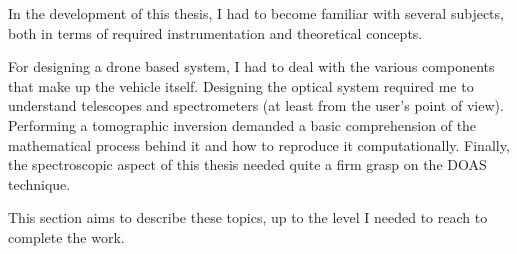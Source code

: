 In the development of this thesis, I had to become familiar with several
subjects, both in terms of required instrumentation and theoretical
concepts.

For designing a drone based system, I had to deal with the various
components that make up the vehicle itself. Designing the optical system
required me to understand telescopes and spectrometers (at least from
the user's point of view). Performing a tomographic inversion demanded a
basic comprehension of the mathematical process behind it and how to
reproduce it computationally. Finally, the spectroscopic aspect of this
thesis needed quite a firm grasp on the \gls{DOAS} technique. 

This section aims to describe these topics, up to the level I needed to
reach to complete the work.
